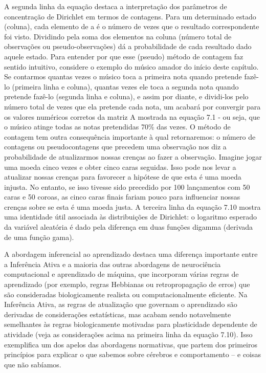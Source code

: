 \documentclass[
  12pt,
]{book}
\begin{document}
A segunda linha da equação destaca a interpretação dos parâmetros de concentração de Dirichlet em termos de contagens. Para um determinado estado (coluna), cada elemento de a é o número de vezes que o resultado correspondente foi visto. Dividindo pela soma dos elementos na coluna (número total de observações ou pseudo-observações) dá a probabilidade de cada resultado dado aquele estado. Para entender por que esse (pseudo) método de contagem faz sentido intuitivo, considere o exemplo do músico amador do início deste capítulo. Se contarmos quantas vezes o músico toca a primeira nota quando pretende fazê-lo (primeira linha e coluna), quantas vezes ele toca a segunda nota quando pretende fazê-lo (segunda linha e coluna), e assim por diante, e dividi-los pelo número total de vezes que ela pretende cada nota, um acabará por convergir para os valores numéricos corretos da matriz A mostrada na equação 7.1 - ou seja, que o músico atinge todas as notas pretendidas 70\% das vezes. O método de contagem tem outra consequência importante à qual retornaremos: o número de contagens ou pseudocontagens que precedem uma observação nos diz a probabilidade de atualizarmos nossas crenças ao fazer a observação. Imagine jogar uma moeda cinco vezes e obter cinco caras seguidas. Isso pode nos levar a atualizar nossas crenças para favorecer a hipótese de que esta é uma moeda injusta. No entanto, se isso tivesse sido precedido por 100 lançamentos com 50 caras e 50 coroas, as cinco caras finais fariam pouco para influenciar nossas crenças sobre se esta é uma moeda justa. A terceira linha da equação 7.10 mostra uma identidade útil associada às distribuições de Dirichlet: o logaritmo esperado da variável aleatória é dado pela diferença em duas funções digamma (derivada de uma função gama).

A abordagem inferencial ao aprendizado destaca uma diferença importante entre a Inferência Ativa e a maioria das outras abordagens de neurociência computacional e aprendizado de máquina, que incorporam várias regras de aprendizado (por exemplo, regras Hebbianas ou retropropagação de erros) que são consideradas biologicamente realista ou computacionalmente eficiente. Na Inferência Ativa, as regras de atualização que governam o aprendizado são derivadas de considerações estatísticas, mas acabam sendo notavelmente semelhantes às regras biologicamente motivadas para plasticidade dependente de atividade (veja as considerações acima na primeira linha da equação 7.10). Isso exemplifica um dos apelos das abordagens normativas, que partem dos primeiros princípios para explicar o que sabemos sobre cérebros e comportamento -- e coisas que não sabíamos.
\end{document}
